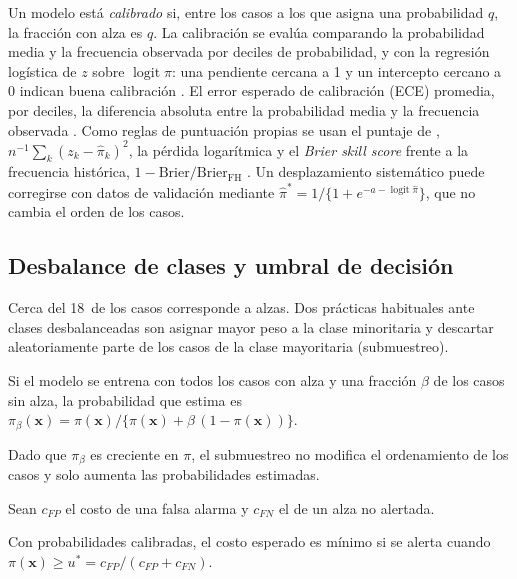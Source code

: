 Un modelo está \emph{calibrado} si, entre los casos a los que asigna una probabilidad $q$, la fracción con alza es $q$. La calibración se evalúa comparando la probabilidad media y la frecuencia observada por deciles de probabilidad, y con la regresión logística de $z$ sobre $\operatorname{logit}\hat\pi$: una pendiente cercana a 1 y un intercepto cercano a 0 indican buena calibración \citep{vancalster2019}. El error esperado de calibración (ECE) promedia, por deciles, la diferencia absoluta entre la probabilidad media y la frecuencia observada \citep{naeini2015}. Como reglas de puntuación propias se usan el puntaje de \citet{brier1950}, $n^{-1}\sum_k(z_k-\hat\pi_k)^2$, la pérdida logarítmica y el \emph{Brier skill score} frente a la frecuencia histórica, $1-\mathrm{Brier}/\mathrm{Brier}_{\mathrm{FH}}$ \citep{gneiting2007}. Un desplazamiento sistemático puede corregirse con datos de validación mediante $\hat\pi^\ast=1/\{1+e^{-a-\operatorname{logit}\hat\pi}\}$, que no cambia el orden de los casos.

\subsection{Desbalance de clases y umbral de decisión}
\label{sec:desbalance}

Cerca del 18\pct\ de los casos corresponde a alzas. Dos prácticas habituales ante clases desbalanceadas son asignar mayor peso a la clase minoritaria y descartar aleatoriamente parte de los casos de la clase mayoritaria (submuestreo).

\begin{proposicion}\label{prop:prior}
Si el modelo se entrena con todos los casos con alza y una fracción $\beta$ de los casos sin alza, la probabilidad que estima es
$\pi_\beta(\mathbf{x})=\pi(\mathbf{x})/\{\pi(\mathbf{x})+\beta\,(1-\pi(\mathbf{x}))\}$.
\end{proposicion}

Dado que $\pi_\beta$ es creciente en $\pi$, el submuestreo no modifica el ordenamiento de los casos y solo aumenta las probabilidades estimadas.

Sean $c_{FP}$ el costo de una falsa alarma y $c_{FN}$ el de un alza no alertada.

\begin{proposicion}\label{prop:umbral}
Con probabilidades calibradas, el costo esperado es mínimo si se alerta cuando $\pi(\mathbf{x})\ge u^\ast=c_{FP}/(c_{FP}+c_{FN})$.
\end{proposicion}

